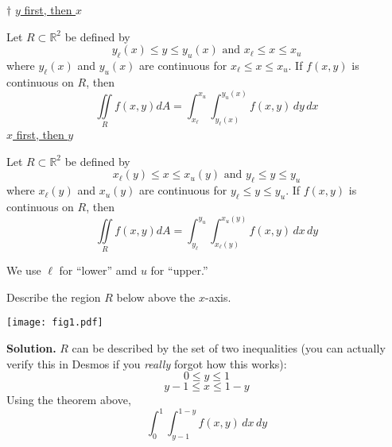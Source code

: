 \begin{Theorem}{$ \dagger $}{}
    \underline{$ y $ first, then $ x $}

    Let $ R\subset \mathbb{R}^2 $ be defined by
    \[ y_\ell(x)\leqslant y\leqslant y_u(x)\text{ and }
        x_{\ell}\leqslant x\leqslant x_u \]
    where $ y_{\ell}(x) $ and $ y_u(x) $ are continuous
    for $ x_{\ell}\leqslant x\leqslant x_u $. If $ f(x,y) $
    is continuous on $ R $, then
    \[ \iint\limits_{R}f(x,y)dA=
        \int_{x_\ell}^{x_u} \int_{y_\ell(x)}^{y_u(x)} f(x,y)\, d{y} \, d{x}  \]
    \underline{$ x $ first, then $ y $}

    Let $ R\subset \mathbb{R}^2 $ be defined by
    \[ x_\ell(y)\leqslant x\leqslant x_u(y)\text{ and }
        y_{\ell}\leqslant y\leqslant y_u \]
    where $ x_{\ell}(y) $ and $ x_u(y) $ are continuous
    for $ y_{\ell}\leqslant y\leqslant y_u $. If $ f(x,y) $
    is continuous on $ R $, then
    \[ \iint\limits_{R}f(x,y)dA=
        \int_{y_\ell}^{y_u} \int_{x_\ell(y)}^{x_u(y)} f(x,y)\, d{x} \, d{y}  \]
\end{Theorem}
We use $ \ell $ for ``lower'' amd $ u $ for ``upper.''
\begin{Example}{}{}
    Describe the region $ R $ below above the $ x $-axis.
    \begin{center}
        \texttt{[image: fig1.pdf]}
    \end{center}
    \textbf{Solution.} $ R $ can be described by the set of two inequalities
    (you can actually verify this in Desmos if you \emph{really} forgot how this works):
    \[ 0\leqslant y\leqslant 1 \]
    \[ y-1\leqslant x\leqslant 1-y \]
    Using the theorem above,
    \[ \int_{0}^{1} \int_{y-1}^{1-y} f(x,y)\, d{x}\, d{y}  \]
\end{Example}
